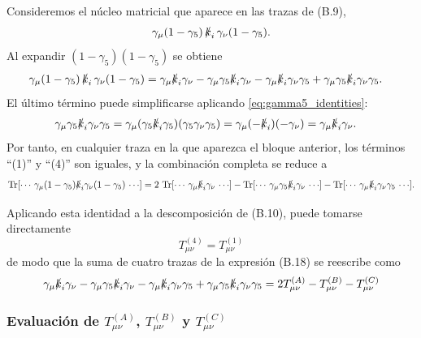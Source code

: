 Consideremos el núcleo matricial que aparece en las trazas de (B.9),
\begin{equation}
\gamma_\mu(1-\gamma_5)\,\slashed{k}_i\,\gamma_\nu(1-\gamma_5).
\end{equation}
Al expandir \((1-\gamma_5)(1-\gamma_5)\) se obtiene
\begin{align}
\gamma_\mu(1-\gamma_5)\,\slashed{k}_i\,\gamma_\nu(1-\gamma_5)
&=
\gamma_\mu\slashed{k}_i\gamma_\nu
-\gamma_\mu\gamma_5\slashed{k}_i\gamma_\nu
-\gamma_\mu\slashed{k}_i\gamma_\nu\gamma_5
+\gamma_\mu\gamma_5\slashed{k}_i\gamma_\nu\gamma_5.
\label{eq:expand_chiral_kernel}
\end{align}
El último término puede simplificarse aplicando \eqref{eq:gamma5_identities}:
\begin{align}
\gamma_\mu\gamma_5\slashed{k}_i\gamma_\nu\gamma_5
&=\gamma_\mu(\gamma_5\slashed{k}_i\gamma_5)(\gamma_5\gamma_\nu\gamma_5)
=\gamma_\mu(-\slashed{k}_i)(-\gamma_\nu)
=\gamma_\mu\slashed{k}_i\gamma_\nu.
\label{eq:last_equals_first}
\end{align}
Por tanto, en cualquier traza en la que aparezca el bloque anterior,
los términos ``(1)'' y ``(4)'' son iguales, y la combinación completa se reduce a
\begin{equation}
\Tr[\cdots\,\gamma_\mu(1-\gamma_5)\slashed{k}_i\gamma_\nu(1-\gamma_5)\,\cdots]
=
2\,\Tr[\cdots\,\gamma_\mu\slashed{k}_i\gamma_\nu\,\cdots]
-\Tr[\cdots\,\gamma_\mu\gamma_5\slashed{k}_i\gamma_\nu\,\cdots]
-\Tr[\cdots\,\gamma_\mu\slashed{k}_i\gamma_\nu\gamma_5\,\cdots].
\label{eq:trace_reduction_2minus1minus1}
\end{equation}

Aplicando esta identidad a la descomposición de (B.10), puede tomarse directamente
\begin{equation}
T_{\mu\nu}^{(4)} = T_{\mu\nu}^{(1)}
\label{eq:T4_equals_T1}
\end{equation}
de modo que la suma de cuatro trazas de la expresión (B.18) se reescribe como
\begin{equation}
\gamma_\mu\slashed{k}_i\gamma_\nu
-\gamma_\mu\gamma_5\slashed{k}_i\gamma_\nu
-\gamma_\mu\slashed{k}_i\gamma_\nu\gamma_5
+\gamma_\mu\gamma_5\slashed{k}_i\gamma_\nu\gamma_5
=
2T_{\mu\nu}^{(A)}-T_{\mu\nu}^{(B)}-T_{\mu\nu}^{(C)}
\label{eq:final_simplified_sum}
\end{equation}

\subsubsection*{Evaluación de $T_{\mu\nu}^{(A)}$, $T_{\mu\nu}^{(B)}$ y $T_{\mu\nu}^{(C)}$}
\label{app:trazas:eval_T_munu_ABC}

